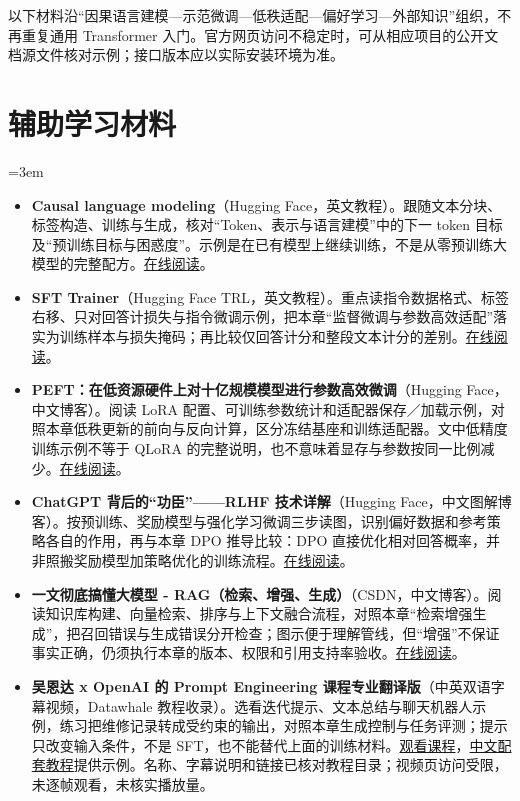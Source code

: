 以下材料沿“因果语言建模—示范微调—低秩适配—偏好学习—外部知识”组织，不再重复通用 Transformer 入门。官方网页访问不稳定时，可从相应项目的公开文档源文件核对示例；接口版本应以实际安装环境为准。
\section*{辅助学习材料}
\begingroup
\emergencystretch=3em
\begin{itemize}
\item \textbf{Causal language modeling}（Hugging Face，英文教程）。跟随文本分块、标签构造、训练与生成，核对“Token、表示与语言建模”中的下一 token 目标及“预训练目标与困惑度”。示例是在已有模型上继续训练，不是从零预训练大模型的完整配方。\href{https://huggingface.co/docs/transformers/tasks/language\_modeling}{在线阅读}。
\item \textbf{SFT Trainer}（Hugging Face TRL，英文教程）。重点读指令数据格式、标签右移、只对回答计损失与指令微调示例，把本章“监督微调与参数高效适配”落实为训练样本与损失掩码；再比较仅回答计分和整段文本计分的差别。\href{https://huggingface.co/docs/trl/sft\_trainer}{在线阅读}。
\item \textbf{PEFT：在低资源硬件上对十亿规模模型进行参数高效微调}（Hugging Face，中文博客）。阅读 LoRA 配置、可训练参数统计和适配器保存／加载示例，对照本章低秩更新的前向与反向计算，区分冻结基座和训练适配器。文中低精度训练示例不等于 QLoRA 的完整说明，也不意味着显存与参数按同一比例减少。\href{https://huggingface.co/blog/zh/peft}{在线阅读}。
\item \textbf{ChatGPT 背后的“功臣”——RLHF 技术详解}（Hugging Face，中文图解博客）。按预训练、奖励模型与强化学习微调三步读图，识别偏好数据和参考策略各自的作用，再与本章 DPO 推导比较：DPO 直接优化相对回答概率，并非照搬奖励模型加策略优化的训练流程。\href{https://huggingface.co/blog/zh/rlhf}{在线阅读}。
\item \textbf{一文彻底搞懂大模型 - RAG（检索、增强、生成）}（CSDN，中文博客）。阅读知识库构建、向量检索、排序与上下文融合流程，对照本章“检索增强生成”，把召回错误与生成错误分开检查；图示便于理解管线，但“增强”不保证事实正确，仍须执行本章的版本、权限和引用支持率验收。\href{https://blog.csdn.net/a2875254060/article/details/142468037}{在线阅读}。
\item \textbf{吴恩达 x OpenAI 的 Prompt Engineering 课程专业翻译版}（中英双语字幕视频，Datawhale 教程收录）。选看迭代提示、文本总结与聊天机器人示例，练习把维修记录转成受约束的输出，对照本章生成控制与任务评测；提示只改变输入条件，不是 SFT，也不能替代上面的训练材料。\href{https://www.bilibili.com/video/BV1Bo4y1A7FU/}{观看课程}，\href{https://github.com/datawhalechina/llm-cookbook}{中文配套教程}提供示例。名称、字幕说明和链接已核对教程目录；视频页访问受限，未逐帧观看，未核实播放量。
\end{itemize}
\endgroup

